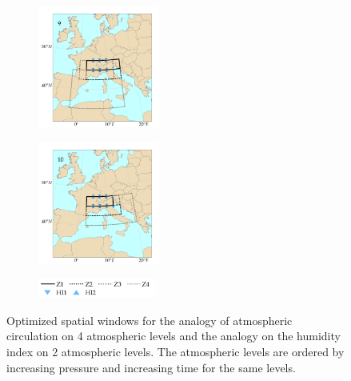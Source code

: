 \documentclass[twocol]{ametsoc}
\begin{document}
\begin{figure}[htb]
	\begin{subfigure}{.5\columnwidth}
		\centering
		\includegraphics[width=4cm]{figures/spatial_win_z4-hi2/Spatial_windows_9.png}
	\end{subfigure}%
	\begin{subfigure}{.5\columnwidth}
		\centering
		\includegraphics[width=4cm]{figures/spatial_win_z4-hi2/Spatial_windows_10.png}
	\end{subfigure}
	\begin{subfigure}{.5\columnwidth}
		\centering
		\includegraphics[width=3.9cm]{figures/spatial_win_z4-hi2/legend.png}
	\end{subfigure}
	\caption{Optimized spatial windows for the analogy of atmospheric circulation on 4 atmospheric levels and the analogy on the humidity index on 2 atmospheric levels. The atmospheric levels are ordered by increasing pressure and increasing time for the same levels.}
	\label{fig:spatial_windows_z4-hi2}
\end{figure}
\end{document}
